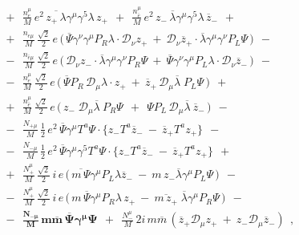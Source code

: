 \documentclass[paper,12pt]{revtex4}
\begin{document}
\begin{eqnarray}
\nonumber
&&
	~~+~~
	\frac{n_e^\mu}{M}\, e^2\,
	\overline{z_+ \, \lambda} \gamma^\mu \gamma^5 
	\lambda\, z_+ 
	~~+~~
	\frac{n_{\bar{e}}^\mu}{M}\, e^2\,
	z_-\, \overline{\lambda}\gamma^\mu\gamma^5
	\lambda\, \overline{z}_-
	~~+~~ \\
\nonumber
&&
	~~+~~
	\frac{n_{e\mu}}{M}\,
	\frac{\sqrt{2}}{2}\, e\,
	\Big(\,
		\overline{\Psi} \gamma^\nu\gamma^\mu P_R
		\lambda \cdot \mathcal{D}_\nu z_+ 
		~+~
		\mathcal{D}_\nu \overline{z}_+ \cdot
		\overline{\lambda} \gamma^\mu \gamma^\nu
		P_L \Psi
	\,
	\Big)
	~~-~~ \\
\nonumber
&&
	~~-~~
	\frac{n_{\bar{e}\mu}}{M}\,
	\frac{\sqrt{2}}{2}\,e\,
	\Big(\,
		\mathcal{D}_\nu z_- \cdot
		\overline{\lambda}\gamma^\mu\gamma^\nu P_R \Psi
		~+~
		\overline{\Psi}\gamma^\nu\gamma^\mu P_L \lambda
		\cdot \mathcal{D}_\nu \overline{z}_-
	\,
	\Big)
	~~-~~ \\
\label{LV_matter_component}
&&
	~~-~~
	\frac{n_e^\mu}{M}\,
	\frac{\sqrt{2}}{2}\, e\,
	\Big(\,
		\overline{\Psi}P_R\, \mathcal{D}_\mu \lambda
		\cdot z_+ 
		~+~
		\overline{z}_+ \,
		\mathcal{D}_\mu 
		\overline{\lambda}\; P_L \Psi
	\,\Big)
	~~+~~ \\
\nonumber
&&
	~~+~~
	\frac{n_{\bar{e}}^\mu}{M}\,
	\frac{\sqrt{2}}{2}\, e\,
	\Big(\,
		z_-\; \mathcal{D}_\mu \overline{\lambda} ~
		P_R \Psi 
		~~+~~
		\Psi P_L \, \mathcal{D}_\mu \overline{\lambda} ~
		\overline{z}_-
	\,\Big) 
	~~-~~ \\
\nonumber
&&
	~~-~~ 
	\frac{N_{+\mu}}{M}\,
	\frac{1}{2}\, e^2\,
	\overline{\Psi}\gamma^\mu T^a \Psi \cdot
	\Big\{
	  z_- T^a \overline{z}_- 
	  ~-~
	  \overline{z}_+ T^a z_+
	\Big\}
	~~-~~ \\
\nonumber
&&
	~~-~~
	\frac{N_{-\mu}}{M}\,
	\frac{1}{2}\, e^2\,
	\overline{\Psi}\gamma^\mu \gamma^5 T^a \Psi \cdot
	\Big\{
	  z_- T^a \overline{z}_- 
	  ~-~
	  \overline{z}_+ T^a z_+
	\Big\}
	~~+~~ \\
\nonumber
&&
	~~+~~
	\frac{N_+^\mu}{M}\,
	\frac{\sqrt{2}}{2}\, i\, e\,
	\Big(\,
		\overline{m\, \Psi} \gamma^\mu P_L
		\lambda \overline{z}_- 
		~-~
		m\, z_- \overline{\lambda}
		\gamma^\mu P_L \Psi
	\,\Big)
	~~-~~ \\
\nonumber
&&
	~~-~~
	\frac{N_+^\mu}{M}\,
	\frac{\sqrt{2}}{2}\, i\, e\,
	\Big(\,
		m\, \overline{\Psi}\gamma^\mu P_R \lambda\, z_+ 
		~-~
		\overline{m\, z_+}\; \overline{\lambda}
		\gamma^\mu P_R \Psi
	\,\Big)
	~~-~~ \\
\nonumber
&&
	~~-~~
\mathbf{
	\frac{N_{-\mu}}{M}\,
	m \overline{m} \,
	\overline{\Psi} \gamma^\mu \Psi
    }
	~~+~~ 
	\frac{N_-^\mu}{M}\, 2 i\, m \overline{m}\,
	\left( 
		\overline{z}_+ \mathcal{D}_\mu z_+ 
		~+~
		z_- \mathcal{D}_\mu \overline{z}_-
	\right)
	~~,
\end{eqnarray}
\end{document}
